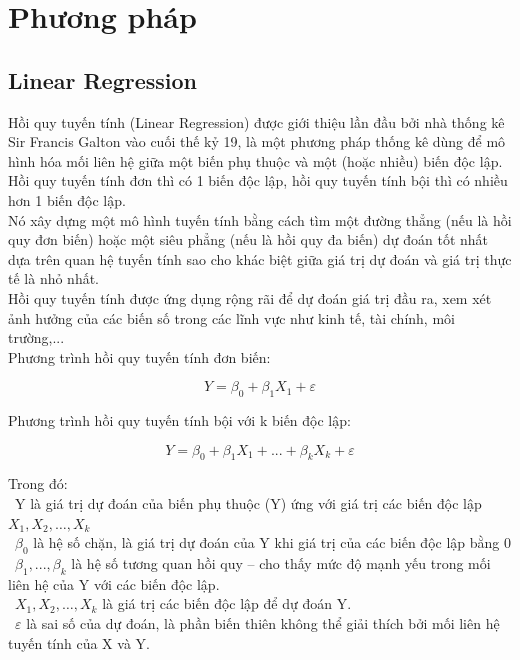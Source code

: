 \documentclass[conference]{IEEEtran}
\begin{document}
\section{Phương pháp} 

\subsection{Linear Regression}
Hồi quy tuyến tính (Linear Regression) được giới thiệu lần đầu bởi nhà thống kê Sir Francis Galton vào cuối thế kỷ 19, là một phương pháp thống kê dùng để mô hình hóa mối liên hệ giữa một biến phụ thuộc và một (hoặc nhiều) biến độc lập. Hồi quy tuyến tính đơn thì có 1 biến độc lập, hồi quy tuyến tính bội thì có nhiều hơn 1 biến độc lập.\\
Nó xây dựng một mô hình tuyến tính bằng cách tìm một đường thẳng (nếu là hồi quy đơn biến) hoặc một siêu phẳng (nếu là hồi quy đa biến) dự đoán tốt nhất dựa trên quan hệ tuyến tính sao cho khác biệt giữa giá trị dự đoán và giá trị thực tế là nhỏ nhất.\\
Hồi quy tuyến tính được ứng dụng rộng rãi để dự đoán giá trị đầu ra, xem xét ảnh hưởng của các biến số trong các lĩnh vực như kinh tế, tài chính, môi trường,...\\
Phương trình hồi quy tuyến tính đơn biến: 
\begin{samepage}
\[Y=\beta_0+\beta_1X_1+\varepsilon\]
\end{samepage}
Phương trình hồi quy tuyến tính bội với k biến độc lập:
\begin{samepage}
\[Y=\beta_0+\beta_1X_1+...+\beta_kX_k+\varepsilon\]
\end{samepage}
Trong đó:\\
        \indent\textbullet\ Y là giá trị dự đoán của biến phụ thuộc (Y) ứng với giá trị các biến độc lập \(X_1, X_2, \ldots, X_k\)\\
        \indent\textbullet\ \(\beta_0\) là hệ số chặn, là giá trị dự đoán của Y khi giá trị của các biến độc lập bằng 0\\
        \indent\textbullet\ \(\beta_1,..., \beta_k\) là hệ số tương quan hồi quy – cho thấy mức độ mạnh yếu trong mối liên hệ của Y với các biến độc lập.\\
        \indent\textbullet\ \(X_1, X_2, \ldots, X_k\) là giá trị các biến độc lập để dự đoán Y.\\
        \indent\textbullet\ \(\varepsilon\) là sai số của dự đoán, là phần biến thiên không thể giải thích bởi mối liên hệ tuyến tính của X và Y.
\end{document}
